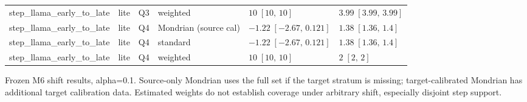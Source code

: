 \begin{longtable}{@{}p{}p{}p{}p{}p{}p{}@{}}
step\_llama\_early\_to\_late & lite & Q3 & weighted & $10\;[10,\,10]$ & $3.99\;[3.99,\,3.99]$ \\
step\_llama\_early\_to\_late & lite & Q4 & Mondrian (source cal) & $-1.22\;[-2.67,\,0.121]$ & $1.38\;[1.36,\,1.4]$ \\
step\_llama\_early\_to\_late & lite & Q4 & standard & $-1.22\;[-2.67,\,0.121]$ & $1.38\;[1.36,\,1.4]$ \\
step\_llama\_early\_to\_late & lite & Q4 & weighted & $10\;[10,\,10]$ & $2\;[2,\,2]$ \\
\bottomrule
\end{longtable}
\noindent Frozen M6 shift results, alpha=0.1. Source-only Mondrian uses the full set if the target stratum is missing; target-calibrated Mondrian has additional target calibration data. Estimated weights do not establish coverage under arbitrary shift, especially disjoint step support.
\endgroup
